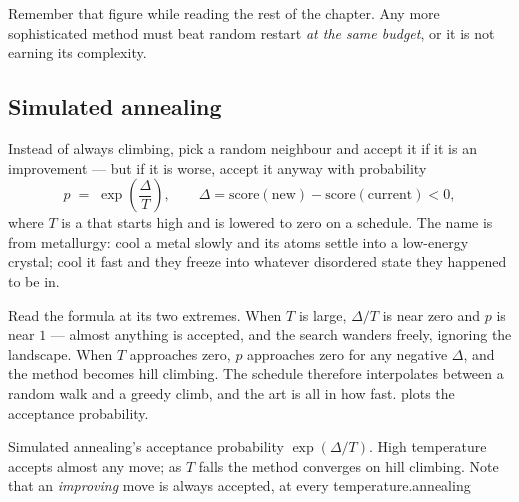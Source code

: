 Remember that figure while reading the rest of the chapter. Any more sophisticated
method must beat random restart \emph{at the same budget}, or it is not earning its
complexity.

\subsection{Simulated annealing}

Instead of always climbing, pick a random neighbour and accept it if it is an
improvement --- but if it is worse, accept it anyway with probability
\[
  p \;=\; \exp\!\left(\frac{\Delta}{T}\right),
  \qquad \Delta = \mathrm{score}(\text{new}) - \mathrm{score}(\text{current}) < 0,
\]
where $T$ is a  that starts high and is lowered to zero on a
schedule. The name is from metallurgy: cool a metal slowly and its atoms settle into
a low-energy crystal; cool it fast and they freeze into whatever disordered state
they happened to be in.

Read the formula at its two extremes. When $T$ is large, $\Delta/T$ is near zero and
$p$ is near $1$ --- almost anything is accepted, and the search wanders freely,
ignoring the landscape. When $T$ approaches zero, $p$ approaches zero for any
negative $\Delta$, and the method becomes hill climbing. The schedule therefore
interpolates between a random walk and a greedy climb, and the art is all in how
fast.  plots the acceptance probability.

%
{Simulated annealing's acceptance probability $\exp(\Delta/T)$. High temperature
accepts almost any move; as $T$ falls the method converges on hill climbing. Note
that an \emph{improving} move is always accepted, at every
temperature.}{annealing}

